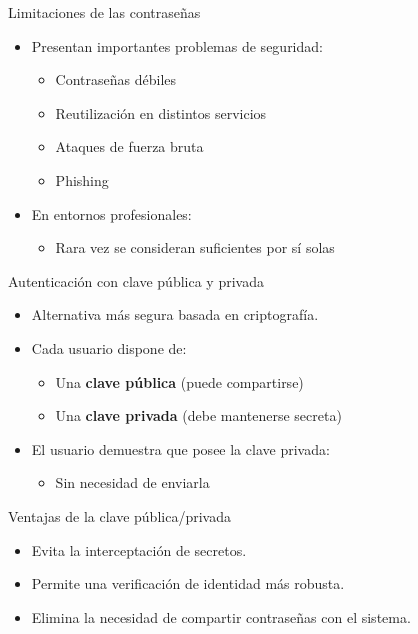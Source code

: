 \documentclass{beamer}
\begin{document}
\begin{frame}{Limitaciones de las contraseñas}
\begin{itemize}
  \item Presentan importantes problemas de seguridad:
  \begin{itemize}
    \item Contraseñas débiles
    \item Reutilización en distintos servicios
    \item Ataques de fuerza bruta
    \item Phishing
  \end{itemize}
  \item En entornos profesionales:
  \begin{itemize}
    \item Rara vez se consideran suficientes por sí solas
  \end{itemize}
\end{itemize}
\end{frame}

\begin{frame}{Autenticación con clave pública y privada}
\begin{itemize}
  \item Alternativa más segura basada en criptografía.
  \item Cada usuario dispone de:
  \begin{itemize}
    \item Una \textbf{clave pública} (puede compartirse)
    \item Una \textbf{clave privada} (debe mantenerse secreta)
  \end{itemize}
  \item El usuario demuestra que posee la clave privada:
  \begin{itemize}
    \item Sin necesidad de enviarla
  \end{itemize}
\end{itemize}
\end{frame}

\begin{frame}{Ventajas de la clave pública/privada}
\begin{itemize}
  \item Evita la interceptación de secretos.
  \item Permite una verificación de identidad más robusta.
  \item Elimina la necesidad de compartir contraseñas con el sistema.
\end{itemize}
\end{frame}
\end{document}
